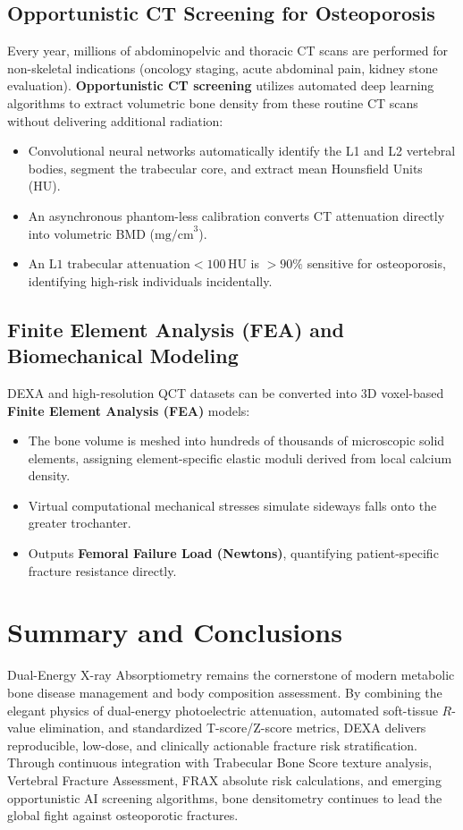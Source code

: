 \documentclass[11pt,a4paper]{article}
\begin{document}
\subsection{Opportunistic CT Screening for Osteoporosis}

Every year, millions of abdominopelvic and thoracic CT scans are performed for non-skeletal indications (oncology staging, acute abdominal pain, kidney stone evaluation). \textbf{Opportunistic CT screening} utilizes automated deep learning algorithms to extract volumetric bone density from these routine CT scans without delivering additional radiation:
\begin{itemize}[leftmargin=*]
    \item Convolutional neural networks automatically identify the L1 and L2 vertebral bodies, segment the trabecular core, and extract mean Hounsfield Units (HU).
    \item An asynchronous phantom-less calibration converts CT attenuation directly into volumetric BMD ($\text{mg/cm}^3$).
    \item An $\text{L1 trabecular attenuation} < 100\,\text{HU}$ is $> 90\%$ sensitive for osteoporosis, identifying high-risk individuals incidentally.
\end{itemize}

\subsection{Finite Element Analysis (FEA) and Biomechanical Modeling}

DEXA and high-resolution QCT datasets can be converted into 3D voxel-based \textbf{Finite Element Analysis (FEA)} models:
\begin{itemize}[leftmargin=*]
    \item The bone volume is meshed into hundreds of thousands of microscopic solid elements, assigning element-specific elastic moduli derived from local calcium density.
    \item Virtual computational mechanical stresses simulate sideways falls onto the greater trochanter.
    \item Outputs \textbf{Femoral Failure Load (Newtons)}, quantifying patient-specific fracture resistance directly.
\end{itemize}

\section{Summary and Conclusions}

Dual-Energy X-ray Absorptiometry remains the cornerstone of modern metabolic bone disease management and body composition assessment. By combining the elegant physics of dual-energy photoelectric attenuation, automated soft-tissue $R$-value elimination, and standardized T-score/Z-score metrics, DEXA delivers reproducible, low-dose, and clinically actionable fracture risk stratification. Through continuous integration with Trabecular Bone Score texture analysis, Vertebral Fracture Assessment, FRAX absolute risk calculations, and emerging opportunistic AI screening algorithms, bone densitometry continues to lead the global fight against osteoporotic fractures.
\end{document}
